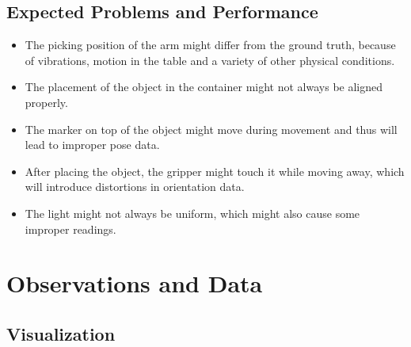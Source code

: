 \documentclass[10pt,a4paper]{article}
\begin{document}
				\subsection{Expected Problems and Performance}
					\begin{itemize}
						\item The picking position of the arm might differ from the ground truth, because of vibrations, motion in the table and a variety of other physical conditions.
						\item The placement of the object in the container might not always be aligned properly.
						\item The marker on top of the object might move during movement and thus will lead to improper pose data.
						\item After placing the object, the gripper might touch it while moving away, which will introduce distortions in orientation data.
						\item The light might not always be uniform, which might also cause some improper readings.						
					\end{itemize}
					
				\section{Observations and Data}
					 \subsection{Visualization}
\end{document}
